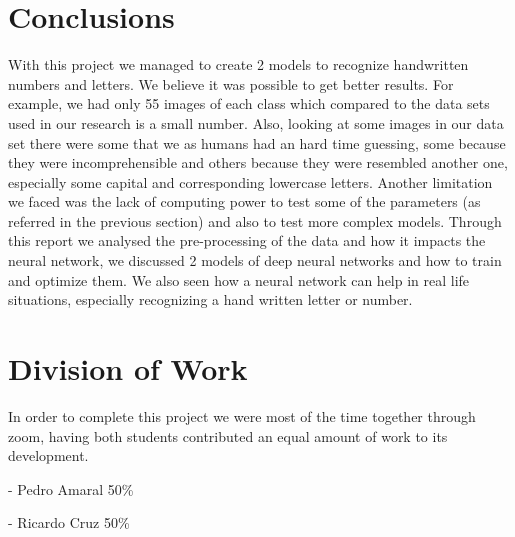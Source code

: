 \documentclass[conference]{IEEEtran}
\newcommand\tab[1][0.4cm]{\hspace*{#1}}
\begin{document}
\section{Conclusions}
With this project we managed to create 2 models to recognize handwritten numbers and letters. We believe it was possible to get better results. For example, we had only 55 images of each class which compared to the data sets used in our research is a small number. Also, looking at some images in our data set there were some that we as humans had an hard time guessing, some because they were incomprehensible and others because they were resembled another one, especially some capital and corresponding lowercase letters. Another limitation we faced was the lack of computing power to test some of the parameters (as referred in the previous section) and also to test more complex models.
\linebreak
\tab Through this report we analysed the pre-processing of the data and how it impacts the neural network, we discussed 2 models of deep neural networks and how to train and optimize them. We also seen how a neural network can help in real life situations, especially recognizing a hand written letter or number.



\nocite{}



\nocite{B}
\nocite{A}
\nocite{D}
\nocite{F}
\nocite{C}
\nocite{H}
\nocite{E}
\nocite{G}
\nocite{I}
\nocite{J}
\nocite{K}
\nocite{L}
\nocite{N}
\nocite{O}
\nocite{P}
\nocite{Q}
\nocite{R}
\nocite{S}
\nocite{T}

\section{Division of Work}
In order to complete this project we were most of the time together through zoom, having both students contributed an equal amount of work to its development.
\begin{flushleft}
- Pedro Amaral 50\%
\end{flushleft}
- Ricardo Cruz 50\%
\end{document}
